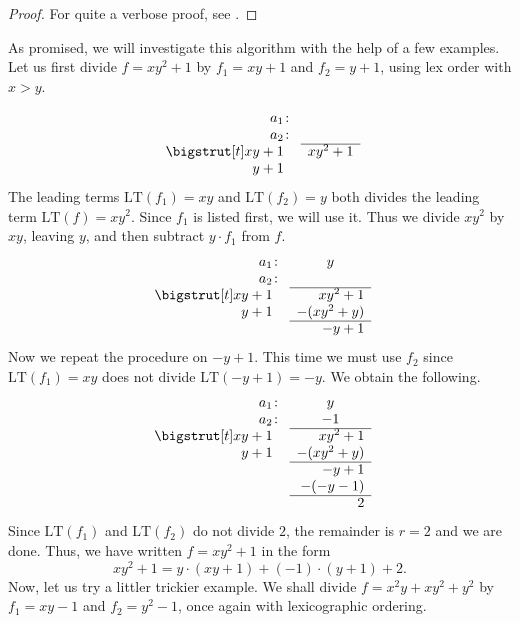 \documentclass[english,bachelor]{liumaiex}
\begin{document}
\begin{proof}
For quite a verbose proof, see \cite[pp. 64-66]{cox}.
\end{proof}
As promised, we will investigate this algorithm with the help of a few examples. Let us first divide $f=xy^2+1$ by $f_1=xy+1$ and $f_2=y+1$, using lex order with $x>y$.

\[
\begin{array}{rr}
   a_1\colon  & \\
   a_2\colon  & \\\cline{2-2}\bigstrut[t]
xy + 1\PhantC & xy^2 + 1\\
y + 1\PhantC &\\
\end{array}
\]
The leading terms $\textrm{LT}(f_1)=xy$ and $\textrm{LT}(f_2)=y$ both divides the leading term $\textrm{LT}(f)=xy^2$. Since $f_1$ is listed first, we will use it. Thus we divide $xy^2$ by $xy$, leaving $y$, and then subtract $y\cdot f_1$ from $f$.
\[
\begin{array}{rr}
   a_1\colon  & \CenterInCol{y}\\
   a_2\colon  & \\\cline{2-2}\bigstrut[t]
xy + 1\PhantC & xy^2 + 1\\
 y + 1\PhantC & -(xy^2 + y)\\\cline{2-2}
              & -y + 1 \\
\end{array}
\]
Now we repeat the procedure on $-y+1$. This time we must use $f_2$ since $\textrm{LT}(f_1)=xy$ does not divide $\textrm{LT}(-y+1)=-y$. We obtain the following.
\[
\begin{array}{rr}
   a_1\colon  & \CenterInCol{y}\\
   a_2\colon  & \CenterInCol{-1}\\\cline{2-2}\bigstrut[t]
xy + 1\PhantC & xy^2 + 1\\
 y + 1\PhantC & -(xy^2 + y)\\\cline{2-2}
              & -y + 1 \\
              & -(-y - 1) \\\cline{2-2}
              & 2
\end{array}
\]
Since $\textrm{LT}(f_1)$ and $\textrm{LT}(f_2)$ do not divide $2$, the remainder is $r=2$ and we are done. Thus, we have written $f=xy^2+1$ in the form
\begin{displaymath}
xy^2+1=y\cdot(xy+1)+(-1)\cdot(y+1)+2.
\end{displaymath}
Now, let us try a littler trickier example. We shall divide $f=x^2y+xy^2+y^2$ by $f_1=xy-1$ and $f_2=y^2-1$, once again with lexicographic ordering.
\end{document}
